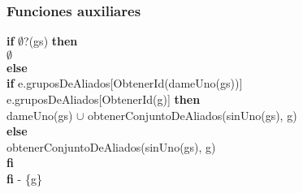 \subsubsection{Funciones auxiliares}
{
	\textbf{if} $\emptyset$?(gs) \textbf{then} \\
	\hspace*{20pt}$\emptyset$	\\
	\textbf{else} \\
		\hspace*{20pt}\textbf{if} e.gruposDeAliados[ObtenerId(dameUno(gs))] \igobs \\ \hspace*{110pt} e.gruposDeAliados[ObtenerId(g)] \textbf{then} \\
			\hspace*{40pt}dameUno(gs) $\cup$ obtenerConjuntoDeAliados(sinUno(gs), g) \\
		\hspace*{20pt}\textbf{else} \\
			\hspace*{40pt}obtenerConjuntoDeAliados(sinUno(gs), g) \\
		\hspace*{20pt}\textbf{fi} \\
	\textbf{fi} - \{g\} \\
}